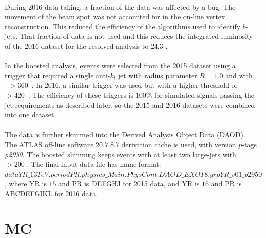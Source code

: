 \paragraph{}
During 2016 data-taking, a fraction of the data was affected by a bug.
The movement of the beam spot was not accounted for in the on-line vertex reconstruction.
This reduced the efficiency of the algorithms used to identify $b$-jets.
That fraction of data is not used and this reduces the integrated luminosity of the 2016 dataset for the resolved analysis to $24.3$ \ifb.

\paragraph{}
In the boosted analysis, events were selected from the 2015 dataset using a trigger that required a single anti-$k_t$ jet with radius parameter $R=1.0$ and with \pt~$>360$~\GeV. In 2016, a similar trigger was used but with a higher threshold of \pt~$>420$~\GeV. The efficiency of these triggers is 100\% for simulated signals passing the jet requirements as described later, so the 2015 and 2016 datasets were combined into one dataset. 

\paragraph{}
The data is further skimmed into the Derived Analysis Object Data (DAOD). The ATLAS off-line software 20.7.8.7 derivation cache is used, with version $p$-tags \textit{p2950}. The boosted slimming keeps events with at least two large-\R jets with \pt~$>200$ \GeV. The final input data file has name format: $dataYR\_13TeV.periodPR.physics\_Main.PhysCont.DAOD\_EXOT8.grpYR\_v01\_p2950$, where YR is $15$ and PR is DEFGHJ for 2015 data, and YR is $16$ and PR is ABCDEFGIKL for 2016 data.


\section{MC}
